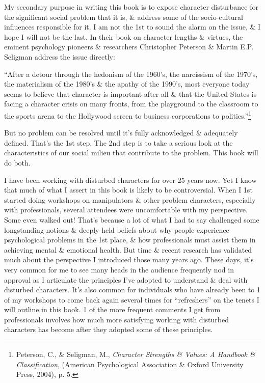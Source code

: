 \documentclass{article}
\numberwithin{equation}{section}
\begin{document}
My secondary purpose in writing this book is to expose character disturbance for the significant social problem that it is, \& address some of the socio-cultural influences responsible for it. I am not the 1st to sound the alarm on the issue, \& I hope I will not be the last. In their book on character lengths \& virtues, the eminent psychology pioneers \& researchers Christopher Peterson \& Martin E.P. Seligman address the issue directly:

``After a detour through the hedonism of the 1960's, the narcissism of the 1970's, the materialism of the 1980's \& the apathy of the 1990's, most everyone today seems to believe that character is important after all \& that the United States is facing a character crisis on many fronts, from the playground to the classroom to the sports arena to the Hollywood screen to business corporations to politics.''\footnote{Peterson, C., \& Seligman, M., \textit{Character Strengths \& Values: A Handbook \& Classification}, (American Psychological Association \& Oxford University Press, 2004), p. 5.}

But no problem can be resolved until it's fully acknowledged \& adequately defined. That's the 1st step. The 2nd step is to take a serious look at the characteristics of our social milieu that contribute to the problem. This book will do both.

I have been working with disturbed characters for over 25 years now. Yet I know that much of what I assert in this book is likely to be controversial. When I 1st started doing workshops on manipulators \& other problem characters, especially with professionals, several attendees were uncomfortable with my perspective. Some even walked out! That's because a lot of what I had to say challenged some longstanding notions \& deeply-held beliefs about why people experience psychological problems in the 1st place, \& how professionals must assist them in achieving mental \& emotional health. But time \& recent research has validated much about the perspective I introduced those many years ago. These days, it's very common for me to see many heads in the audience frequently nod in approval as I articulate the principles I've adopted to understand \& deal with disturbed characters. It's also common for individuals who have already been to 1 of my workshops to come back again several times for ``refreshers'' on the tenets I will outline in this book. 1 of the more frequent comments I get from professionals involves how much more satisfying working with disturbed characters has become after they adopted some of these principles.
\end{document}
